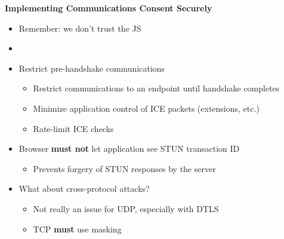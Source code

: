 \documentclass[helvetica]{seminar}
\newcommand{\heading}[1]{%
  \begin{center} 
    \large\bf 
    #1 
  \end{center} 
  \vspace{.4 in}}
\begin{document}
\begin{slide}
\heading{Implementing Communications Consent Securely}

\vspace{-.25in}
\begin{itemize}
\item Remember: we don't trust the JS
\item[]
\item Restrict pre-handshake communications
\begin{itemize}
\item Restrict communications to an endpoint until handshake completes
\item Minimize application control of ICE packets (extensions, etc.)
\item Rate-limit ICE checks
\end{itemize}
\item Browser \textbf{must not} let application see STUN transaction ID
\begin{itemize}
\item Prevents forgery of STUN responses by the server
\end{itemize}
\item What about cross-protocol attacks?
\begin{itemize}
\item Not really an issue for UDP, especially with DTLS
\item TCP \textbf{must} use masking
\end{itemize}

\end{itemize}

\end{slide}
\end{document}
